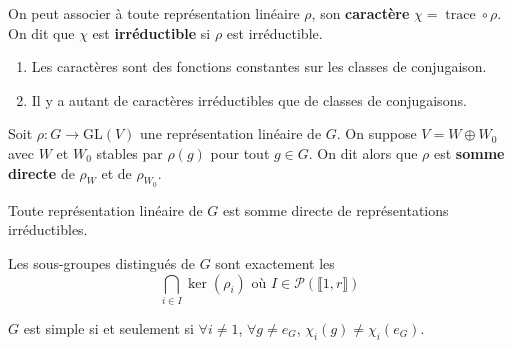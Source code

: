   \begin{definition}
    On peut associer à toute représentation linéaire $\rho$, son \textbf{caractère} $\chi = \operatorname{trace} \circ \rho$. On dit que $\chi$ est \textbf{irréductible} si $\rho$ est irréductible.
  \end{definition}

  \begin{proposition}
    \begin{enumerate}[label={\bfseries(\roman*)}]
      \item Les caractères sont des fonctions constantes sur les classes de conjugaison.
      \item Il y a autant de caractères irréductibles que de classes de conjugaisons.
    \end{enumerate}
  \end{proposition}

  \begin{definition}
    Soit $\rho : G \rightarrow \mathrm{GL}(V)$ une représentation linéaire de $G$. On suppose $V = W \oplus W_0$ avec $W$ et $W_0$ stables par $\rho(g)$ pour tout $g \in G$. On dit alors que $\rho$ est \textbf{somme directe} de $\rho_W$ et de $\rho_{W_0}$.
  \end{definition}

  \begin{theorem}
    Toute représentation linéaire de $G$ est somme directe de représentations irréductibles.
  \end{theorem}


  \begin{theorem}
    Les sous-groupes distingués de $G$ sont exactement les
    \[ \bigcap_{i \in I} \ker(\rho_i) \text{ où } I \in \mathcal{P}(\llbracket 1, r \rrbracket) \]
  \end{theorem}

  \begin{corollary}
    $G$ est simple si et seulement si $\forall i \neq 1$, $\forall g \neq e_G$, $\chi_i(g) \neq \chi_i(e_G)$.
  \end{corollary}

